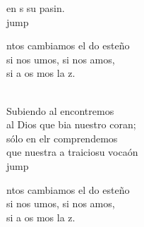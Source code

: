 \begin{cancion}
	en s su pasin.\\jump\\
	\begin{chorus}%
	ntos cambiamos el do esteño\\
	si nos umos, si nos amos,\\
	si a os mos la z.\\
	\end{chorus}%
	\jump\\
	Subiendo al  encontremos\\
	al Dios que bia nuestro coran; \\
	sólo en elr comprendemos\\
	que nuestra a traiciosu vocaón\\jump\\
	\begin{chorus}%
	ntos cambiamos el do esteño\\
	si nos umos, si nos amos,\\
	si a os mos la z.\\
	\end{chorus}%
	\jump\\
\end{cancion}%
